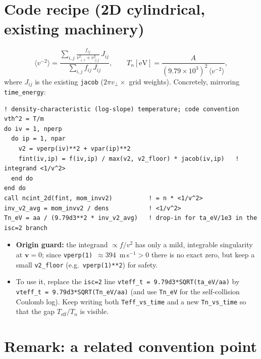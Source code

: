 \documentclass[11pt,a4paper]{article}
\begin{document}
\section{Code recipe (2D cylindrical, existing machinery)}

\begin{equation}
  \langle v^{-2}\rangle
  = \frac{\displaystyle\sum_{i,j}\frac{f_{ij}}{v_{\perp i}^2+v_{\parallel j}^2}\,J_{ij}}
         {\displaystyle\sum_{i,j} f_{ij}\,J_{ij}},
  \qquad
  T_n[\mathrm{eV}] = \frac{A}{(9.79\times10^3)^2\,\langle v^{-2}\rangle},
\end{equation}
where $J_{ij}$ is the existing \texttt{jacob} ($2\pi v_\perp\times$ grid
weights). Concretely, mirroring \texttt{time\_energy}:

\begin{verbatim}
! density-characteristic (log-slope) temperature; code convention vth^2 = T/m
do iv = 1, nperp
  do ip = 1, npar
    v2 = vperp(iv)**2 + vpar(ip)**2
    fint(iv,ip) = f(iv,ip) / max(v2, v2_floor) * jacob(iv,ip)   ! integrand <1/v^2>
  end do
end do
call ncint_2d(fint, mom_invv2)          ! = n * <1/v^2>
inv_v2_avg = mom_invv2 / dens           ! <1/v^2>
Tn_eV = aa / (9.79d3**2 * inv_v2_avg)   ! drop-in for ta_eV/1e3 in the isc=2 branch
\end{verbatim}

\begin{itemize}
  \item \textbf{Origin guard:} the integrand $\propto f/v^2$ has only a mild,
        integrable singularity at $\mathbf v = 0$; since
        \texttt{vperp(1)}~$\approx 394$~m\,s$^{-1} > 0$ there is no exact zero,
        but keep a small \texttt{v2\_floor} (e.g.\ \texttt{vperp(1)**2}) for
        safety.
  \item To use it, replace the \texttt{isc=2} line
        \texttt{vteff\_t = 9.79d3*SQRT(ta\_eV/aa)} by
        \texttt{vteff\_t = 9.79d3*SQRT(Tn\_eV/aa)} (and use \texttt{Tn\_eV} for
        the self-collision Coulomb log). Keep writing both
        \texttt{Teff\_vs\_time} and a new \texttt{Tn\_vs\_time} so that the gap
        $T_\mathrm{eff}/T_n$ is visible.
\end{itemize}

\section*{Remark: a related convention point}
\end{document}

